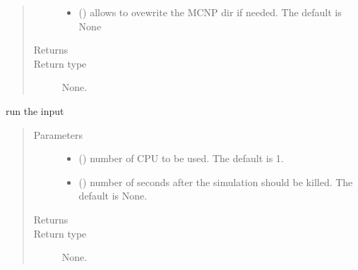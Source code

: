 \documentclass[letterpaper,10pt,english]{sphinxmanual}
\begin{document}
\begin{fulllineitems}
\begin{fulllineitems}
\begin{quote}
\begin{description}
\begin{itemize}
\item {} 
 () \textendash{} allows to ovewrite the MCNP dir if needed. The default is None

\end{itemize}

\item[{Returns}] \leavevmode


\item[{Return type}] \leavevmode
None.

\end{description}\end{quote}

\end{fulllineitems}


\begin{fulllineitems}
\label{\detokenize{api/inputgeneration:testrun.Test.run}}
run the input
\begin{quote}\begin{description}
\item[{Parameters}] \leavevmode\begin{itemize}
\item {} 
 (\sphinxstyleliteralemphasis{\sphinxupquote{, }}) \textendash{} number of CPU to be used. The default is 1.

\item {} 
 (\sphinxstyleliteralemphasis{\sphinxupquote{, }}) \textendash{} number of seconds after the simulation should be killed.
The default is None.

\end{itemize}

\item[{Returns}] \leavevmode


\item[{Return type}] \leavevmode
None.

\end{description}\end{quote}

\end{fulllineitems}


\end{fulllineitems}
\end{document}
